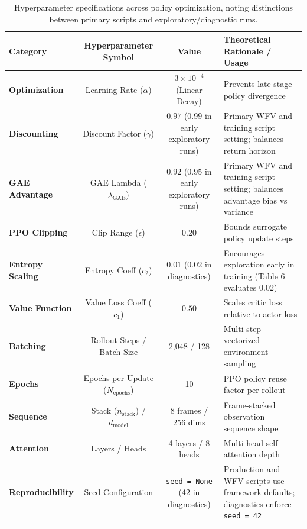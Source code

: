 \documentclass[11pt,a4paper]{article}
\begin{document}
\begin{table}[H]
\centering
\small
\begin{tabularx}{\textwidth}{l c c X}
\toprule
\textbf{Category} & \textbf{Hyperparameter Symbol} & \textbf{Value} & \textbf{Theoretical Rationale / Usage} \\
\midrule
\textbf{Optimization} & Learning Rate ($\alpha$) & $3 \times 10^{-4}$ (Linear Decay) & Prevents late-stage policy divergence \\
\textbf{Discounting} & Discount Factor ($\gamma$) & $0.97$ ($0.99$ in early exploratory runs) & Primary WFV and training script setting; balances return horizon \\
\textbf{GAE Advantage} & GAE Lambda ($\lambda_{\text{GAE}}$) & $0.92$ ($0.95$ in early exploratory runs) & Primary WFV and training script setting; balances advantage bias vs variance \\
\textbf{PPO Clipping} & Clip Range ($\epsilon$) & $0.20$ & Bounds surrogate policy update steps \\
\textbf{Entropy Scaling} & Entropy Coeff ($c_2$) & $0.01$ ($0.02$ in diagnostics) & Encourages exploration early in training (Table 6 evaluates $0.02$) \\
\textbf{Value Function} & Value Loss Coeff ($c_1$) & $0.50$ & Scales critic loss relative to actor loss \\
\textbf{Batching} & Rollout Steps / Batch Size & 2,048 / 128 & Multi-step vectorized environment sampling \\
\textbf{Epochs} & Epochs per Update ($N_{\text{epochs}}$) & 10 & PPO policy reuse factor per rollout \\
\textbf{Sequence} & Stack ($n_{\text{stack}}$) / $d_{\text{model}}$ & 8 frames / 256 dims & Frame-stacked observation sequence shape \\
\textbf{Attention} & Layers / Heads & 4 layers / 8 heads & Multi-head self-attention depth \\
\textbf{Reproducibility} & Seed Configuration & \texttt{seed = None} (42 in diagnostics) & Production and WFV scripts use framework defaults; diagnostics enforce \texttt{seed = 42} \\
\bottomrule
\end{tabularx}
\caption{Hyperparameter specifications across policy optimization, noting distinctions between primary scripts and exploratory/diagnostic runs.}
\label{tab:hyperparameters}
\end{table}
\end{document}
